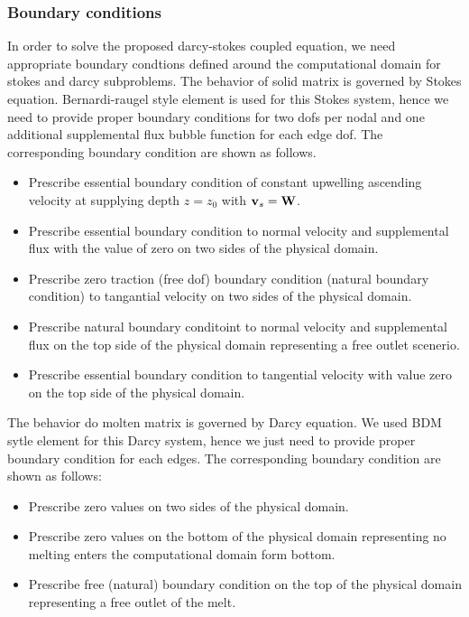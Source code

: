 \subsubsection{Boundary conditions}
In order to solve the proposed darcy-stokes coupled equation, 
we need appropriate boundary condtions defined around the computational domain for stokes and darcy
subproblems.
The behavior of solid matrix is governed by Stokes equation.
Bernardi-raugel style element is used for this Stokes system, hence we need to provide
proper boundary conditions for two dofs per nodal and one additional supplemental 
flux bubble function for each edge dof.
The corresponding boundary condition are shown as follows.
\begin{itemize}
		  \item Prescribe essential boundary condition of constant upwelling ascending
					 velocity at supplying depth $z = z_0$ with $\bold{v}_s = \bold{W}$.
        \item Prescribe essential boundary condition to normal velocity and supplemental flux with the value of zero 
					 on two sides of the physical domain.
		  \item Prescribe zero traction (free dof) boundary condition (natural boundary condition) to tangantial 
					 velocity on two sides of the physical domain.
        \item Prescribe natural boundary conditoint to normal velocity and supplemental flux on the top side of
					 the physical domain representing a free outlet scenerio.
		  \item Prescribe essential boundary condition to tangential velocity with value zero on the top side of the physical domain.
\end{itemize}
The behavior do molten matrix is governed by Darcy equation.
We used BDM sytle element for this Darcy system, hence we just need to provide
proper boundary condition for each edges.
The corresponding boundary condition are shown as follows:
\begin{itemize}
        \item Prescribe zero values on two sides of the physical domain. 
        \item Prescribe zero values on the bottom of the physical domain representing no melting enters the
					 computational domain form bottom.
        \item Prescribe free (natural) boundary condition on the top of the physical domain representing
					 a free outlet of the melt.
\end{itemize}

